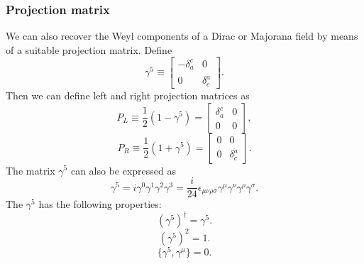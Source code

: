 \subsubsection{Projection matrix}
We can also recover the Weyl components of a Dirac or Majorana field by means of a suitable projection matrix. Define
\[\gamma^5 \equiv \left[ \begin{matrix} -\delta_a^{c}& 0\\ 0& \delta^{\dot{a}}_{\dot{c}}\end{matrix} \right].\]
Then we can define left and right projection matrices as
\[P_L \equiv \frac{1}{2}(1-\gamma^5) = \left[ \begin{matrix} \delta_a^{c}& 0\\ 0& 0\end{matrix} \right],\]
\[P_R \equiv \frac{1}{2}(1+\gamma^5) = \left[ \begin{matrix} 0& 0\\ 0& \delta^{\dot{a}}_{\dot{c}}\end{matrix} \right].\]
The matrix $\gamma^5$ can also be expressed as
\[\gamma^5 = i \gamma^0 \gamma^1 \gamma^2 \gamma^3 = \frac{i}{24} \epsilon_{\mu \nu \rho \sigma}\gamma^{\mu} \gamma^{\nu} \gamma^{\rho} \gamma^{\sigma}.\]
The $\gamma^5$ has the following properties:
\[(\gamma^5)^{\dagger} = \gamma^5.\]
\[(\gamma^5)^2 = 1.\]
\[\{\gamma^5,\gamma^{\mu}\} = 0.\]

